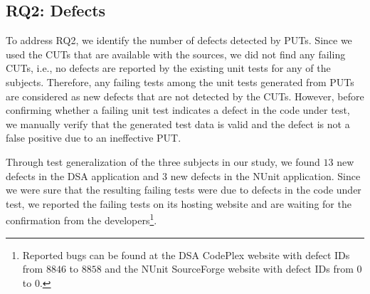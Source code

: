 \subsection{RQ2: Defects}

To address RQ2, we identify the number of defects detected by PUTs. Since we used the CUTs that are available with the sources, we did not find any failing CUTs, i.e., no defects are reported by the existing unit tests for any of the subjects. Therefore, any failing tests among the unit tests generated from PUTs are considered as new defects that are not detected by the CUTs. However, before confirming whether a failing unit test indicates a defect in the code under test, we manually verify that the generated test data is valid and the defect is not a false positive due to an ineffective PUT. 

Through test generalization of the three subjects in our study, we found $13$ new defects in the DSA application and $3$ new defects in the NUnit application. Since we were sure that the resulting failing tests were due to defects in the code under test, we reported the failing tests on its hosting website and are waiting for the confirmation from the developers\footnote{Reported bugs can be found at the DSA CodePlex website with defect IDs from $8846$ to $8858$ and the NUnit SourceForge website with defect IDs from $0$ to $0$.}.

